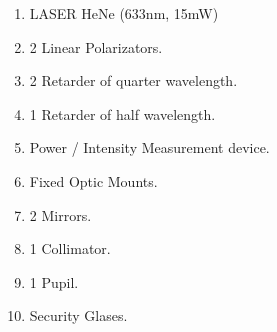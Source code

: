 
\begin{enumerate}
    \item LASER HeNe (633nm, 15mW)
    \item 2 Linear Polarizators.
    \item 2 Retarder of quarter wavelength.
    \item 1 Retarder of half wavelength.
    \item Power / Intensity Measurement device. 
    \item Fixed Optic Mounts.
    \item 2 Mirrors.
    \item 1 Collimator.
    \item 1 Pupil.
    \item Security Glases.
\end{enumerate}
